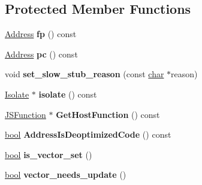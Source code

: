 \subsection*{Protected Member Functions}
\begin{DoxyCompactItemize}
\item 
\mbox{\label{classv8_1_1internal_1_1IC_afe29da2b7c28894877c57b24a7c4f2a6}} 
\mbox{\hyperlink{classuintptr__t}{Address}} {\bfseries fp} () const
\item 
\mbox{\label{classv8_1_1internal_1_1IC_ae3f073796d1c328aa615eaf0bce47701}} 
\mbox{\hyperlink{classuintptr__t}{Address}} {\bfseries pc} () const
\item 
\mbox{\label{classv8_1_1internal_1_1IC_a3258c0d1f71f6a32353cf3319455d073}} 
void {\bfseries set\+\_\+slow\+\_\+stub\+\_\+reason} (const \mbox{\hyperlink{classchar}{char}} $\ast$reason)
\item 
\mbox{\label{classv8_1_1internal_1_1IC_a790b764e0094402a9a27322fab61c7c8}} 
\mbox{\hyperlink{classv8_1_1internal_1_1Isolate}{Isolate}} $\ast$ {\bfseries isolate} () const
\item 
\mbox{\label{classv8_1_1internal_1_1IC_a65e2b66b8d776387d233b40cb664e07d}} 
\mbox{\hyperlink{classv8_1_1internal_1_1JSFunction}{J\+S\+Function}} $\ast$ {\bfseries Get\+Host\+Function} () const
\item 
\mbox{\label{classv8_1_1internal_1_1IC_a981717517e26c43eb51c1e179d10dd44}} 
\mbox{\hyperlink{classbool}{bool}} {\bfseries Address\+Is\+Deoptimized\+Code} () const
\item 
\mbox{\label{classv8_1_1internal_1_1IC_a39bce448a405f3137d7fb8a8c3d2cda1}} 
\mbox{\hyperlink{classbool}{bool}} {\bfseries is\+\_\+vector\+\_\+set} ()
\item 
\mbox{\label{classv8_1_1internal_1_1IC_a47ca21a1fbdb0b1146cb42f3844a9b62}} 
\mbox{\hyperlink{classbool}{bool}} {\bfseries vector\+\_\+needs\+\_\+update} ()
\item 
\mbox{\label{classv8_1_1internal_1_1IC_a2f741236d469be54f4c8806103249025}} 

\end{DoxyCompactItemize}
